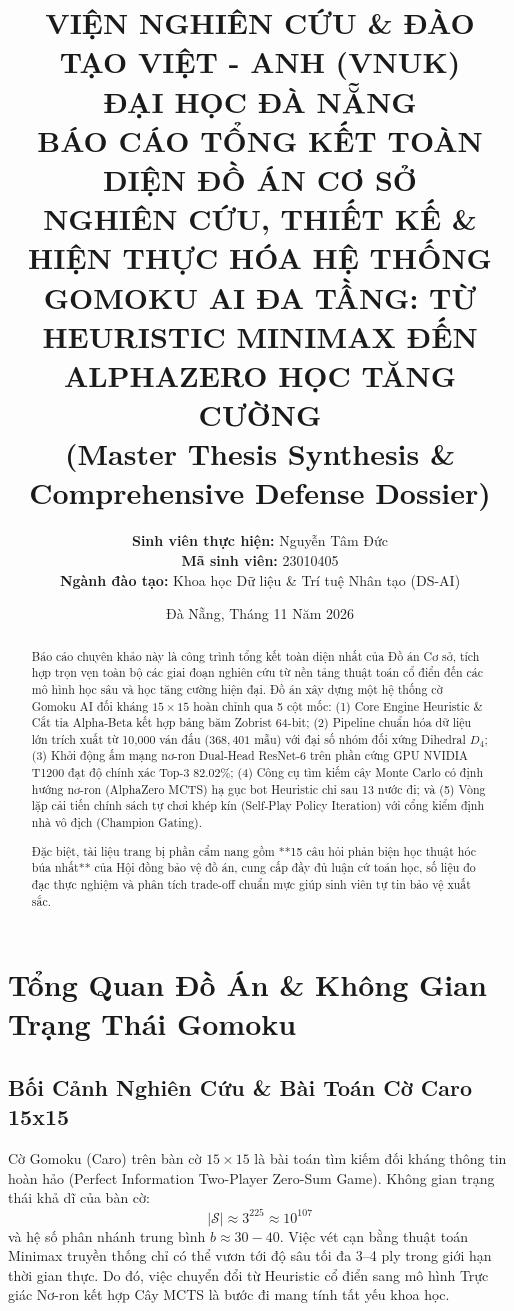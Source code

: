\documentclass[12pt,a4paper,oneside]{report}
\title{
    \vspace{-1.5cm}
    \textbf{\Large VIỆN NGHIÊN CỨU \& ĐÀO TẠO VIỆT - ANH (VNUK)}\\
    \textbf{\large ĐẠI HỌC ĐÀ NẴNG}\\
    \vspace{1.0cm}
    \textbf{\Huge BÁO CÁO TỔNG KẾT TOÀN DIỆN ĐỒ ÁN CƠ SỞ}\\
    \vspace{0.5cm}
    \textbf{\LARGE NGHIÊN CỨU, THIẾT KẾ \& HIỆN THỰC HÓA HỆ THỐNG GOMOKU AI ĐA TẦNG: TỪ HEURISTIC MINIMAX ĐẾN ALPHAZERO HỌC TĂNG CƯỜNG}\\
    \vspace{0.8cm}
    \textbf{\Large (Master Thesis Synthesis \& Comprehensive Defense Dossier)}
}
\author{
    \textbf{Sinh viên thực hiện:} Nguyễn Tâm Đức\\
    \textbf{Mã sinh viên:} 23010405\\
    \textbf{Ngành đào tạo:} Khoa học Dữ liệu \& Trí tuệ Nhân tạo (DS-AI)
}
\date{Đà Nẵng, Tháng 11 Năm 2026}
\begin{document}
\maketitle

\begin{abstract}
Báo cáo chuyên khảo này là công trình tổng kết toàn diện nhất của Đồ án Cơ sở, tích hợp trọn vẹn toàn bộ các giai đoạn nghiên cứu từ nền tảng thuật toán cổ điển đến các mô hình học sâu và học tăng cường hiện đại. Đồ án xây dựng một hệ thống cờ Gomoku AI đối kháng $15 \times 15$ hoàn chỉnh qua 5 cột mốc: (1) Core Engine Heuristic \& Cắt tỉa Alpha-Beta kết hợp bảng băm Zobrist 64-bit; (2) Pipeline chuẩn hóa dữ liệu lớn trích xuất từ 10,000 ván đấu ($368,401$ mẫu) với đại số nhóm đối xứng Dihedral $D_4$; (3) Khởi động ấm mạng nơ-ron Dual-Head ResNet-6 trên phần cứng GPU NVIDIA T1200 đạt độ chính xác Top-3 $82.02\%$; (4) Công cụ tìm kiếm cây Monte Carlo có định hướng nơ-ron (AlphaZero MCTS) hạ gục bot Heuristic chỉ sau 13 nước đi; và (5) Vòng lặp cải tiến chính sách tự chơi khép kín (Self-Play Policy Iteration) với cổng kiểm định nhà vô địch (Champion Gating).

Đặc biệt, tài liệu trang bị phần cẩm nang gồm **15 câu hỏi phản biện học thuật hóc búa nhất** của Hội đồng bảo vệ đồ án, cung cấp đầy đủ luận cứ toán học, số liệu đo đạc thực nghiệm và phân tích trade-off chuẩn mực giúp sinh viên tự tin bảo vệ xuất sắc.
\end{abstract}

\tableofcontents
\newpage

\chapter{Tổng Quan Đồ Án \& Không Gian Trạng Thái Gomoku}

\section{Bối Cảnh Nghiên Cứu \& Bài Toán Cờ Caro 15x15}

Cờ Gomoku (Caro) trên bàn cờ $15 \times 15$ là bài toán tìm kiếm đối kháng thông tin hoàn hảo (Perfect Information Two-Player Zero-Sum Game). 
Không gian trạng thái khả dĩ của bàn cờ:
\begin{equation}
    |\mathcal{S}| \approx 3^{225} \approx 10^{107}
\end{equation}
và hệ số phân nhánh trung bình $b \approx 30 - 40$. Việc vét cạn bằng thuật toán Minimax truyền thống chỉ có thể vươn tới độ sâu tối đa 3--4 ply trong giới hạn thời gian thực. Do đó, việc chuyển đổi từ Heuristic cổ điển sang mô hình Trực giác Nơ-ron kết hợp Cây MCTS là bước đi mang tính tất yếu khoa học.
\end{document}
